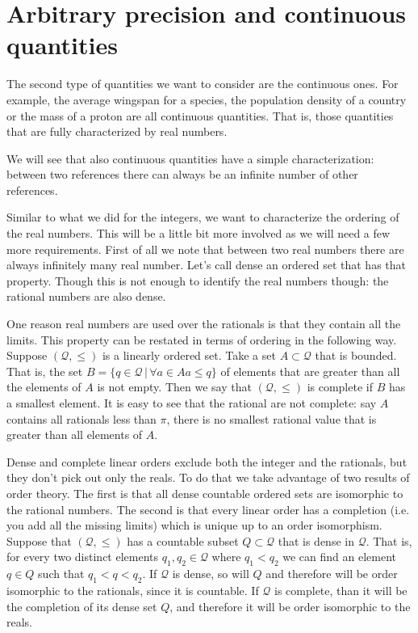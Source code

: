 \documentclass[11pt,letterpaper,fleqn]{memoir} %
\begin{document}
\section{Arbitrary precision and continuous quantities}

The second type of quantities we want to consider are the continuous ones. For example, the average wingspan for a species, the population density of a country or the mass of a proton are all continuous quantities. That is, those quantities that are fully characterized by real numbers.

We will see that also continuous quantities have a simple characterization: between two references there can always be an infinite number of other references.

Similar to what we did for the integers, we want to characterize the ordering of the real numbers. This will be a little bit more involved as we will need a few more requirements. First of all we note that between two real numbers there are always infinitely many real number. Let's call dense an ordered set that has that property. Though this is not enough to identify the real numbers though: the rational numbers are also dense.

One reason real numbers are used over the rationals is that they contain all the limits. This property can be restated in terms of ordering in the following way. Suppose $(\mathcal{Q}, \leq)$ is a linearly ordered set. Take a set $A \subset \mathcal{Q}$ that is bounded. That is, the set $B = \{ q \in \mathcal{Q} \, | \, \forall a \in A a \leq q \}$ of elements that are greater than all the elements of $A$ is not empty. Then we say that $(\mathcal{Q}, \leq)$ is complete if $B$ has a smallest element. It is easy to see that the rational are not complete: say $A$ contains all rationals less than $\pi$, there is no smallest rational value that is greater than all elements of $A$.

Dense and complete linear orders exclude both the integer and the rationals, but they don't pick out only the reals. To do that we take advantage of two results of order theory. The first is that all dense countable ordered sets are isomorphic to the rational numbers. The second is that every linear order has a completion (i.e. you add all the missing limits) which is unique up to an order isomorphism. Suppose that $(\mathcal{Q}, \leq)$ has a countable subset $Q \subset \mathcal{Q}$ that is dense in $\mathcal{Q}$. That is, for every two distinct elements $q_1, q_2 \in \mathcal{Q}$ where $q_1 < q_2$ we can find an element $q \in Q$ such that $q_1 < q < q_2$. If $\mathcal{Q}$ is dense, so will $Q$ and therefore will be order isomorphic to the rationals, since it is countable. If $\mathcal{Q}$ is complete, than it will be the completion of its dense set $Q$, and therefore it will be order isomorphic to the reals.
\end{document}
